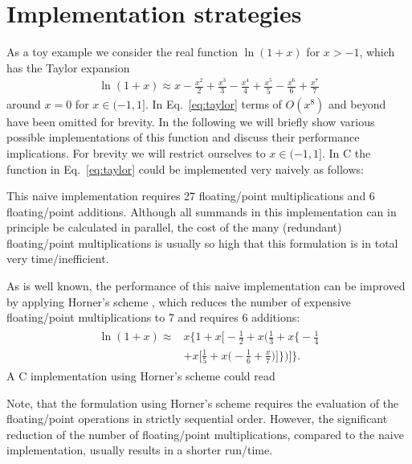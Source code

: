 \documentclass[10pt,DIV16,twocolumn,numbers=noenddot]{scrartcl}
\begin{document}
\section{Implementation strategies}
\label{sec:toymodel}

As a toy example we consider the real function $\ln(1+x)$ for $x>-1$,
which has the Taylor expansion
%
\begin{align}
  \ln(1+x) \approx x - \frac{x^2}{2} + \frac{x^3}{3} - \frac{x^4}{4} + \frac{x^5}{5} - \frac{x^6}{6} + \frac{x^7}{7}
  \label{eq:taylor}
\end{align}
%
around $x=0$ for $x\in(-1,1]$.  In Eq.~\eqref{eq:taylor} terms of
$O(x^8)$ and beyond have been omitted for brevity.  In the following
we will briefly show various possible implementations of this function
and discuss their performance implications.  For brevity we will
restrict ourselves to $x\in(-1,1]$.  In C the function in
Eq.~\eqref{eq:taylor} could be implemented very naively as follows:
%

%
This naive implementation requires 27 floating\-/point multiplications
and 6 floating\-/point additions.  Although all summands in this
implementation can in principle be calculated in parallel, the cost of
the many (redundant) floating\-/point multiplications is usually so
high that this formulation is in total very time\-/inefficient.

As is well known, the performance of this naive implementation can be
improved by applying Horner's scheme \cite{horner}, which reduces the
number of expensive floating\-/point multiplications to 7 and requires
6 additions:
%
\begin{align}
\begin{split}
  \ln(1+x) \approx{}& x \bigg\{1 + x \bigg[-\frac{1}{2} + x \bigg(\frac{1}{3} + x \bigg\{-\frac{1}{4} \\
  &+ x \bigg[\frac{1}{5} + x\bigg(-\frac{1}{6} + \frac{x}{7}\bigg)\bigg]\bigg\}\bigg)\bigg]\bigg\}.
\end{split}\label{eq:horner}%
\end{align}
%
A C implementation using Horner's scheme could read
%

%
Note, that the formulation using Horner's scheme requires the
evaluation of the floating\-/point operations in strictly sequential
order.  However, the significant reduction of the number of
floating\-/point multiplications, compared to the naive
implementation, usually results in a shorter run\-/time.
\end{document}
